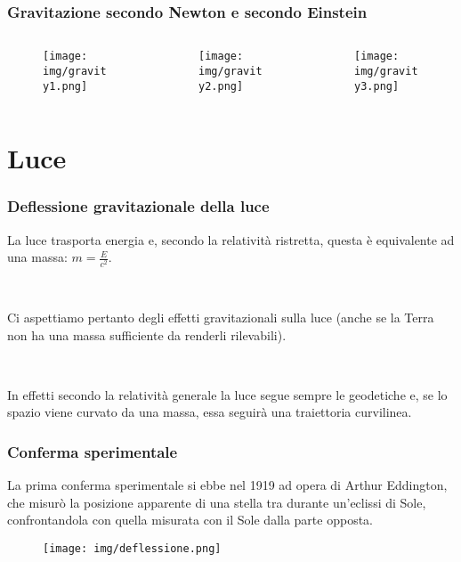 \documentclass[]{beamer}
\theoremstyle{plain}
\begin{document}
\begin{frame}
  \frametitle{Gravitazione secondo Newton e secondo Einstein}
  \begin{columns}
    \begin{column}{0.3\textwidth}
      \begin{figure}
        \texttt{[image: img/gravity1.png]}
      \end{figure}
    \end{column}
    \begin{column}{0.3\textwidth}
      \begin{figure}
        \texttt{[image: img/gravity2.png]}
      \end{figure}
    \end{column}
    \begin{column}{0.3\textwidth}
      \begin{figure}
        \texttt{[image: img/gravity3.png]}
      \end{figure}
    \end{column}

  \end{columns}
\end{frame}

\section{Luce}

\begin{frame}
\frametitle{Deflessione gravitazionale della luce}
La luce trasporta energia e, secondo la relatività ristretta, questa è equivalente ad una massa: $ m = \frac{E}{c^2} $.\pause

~

Ci aspettiamo pertanto degli effetti gravitazionali sulla luce (anche se la Terra non ha una massa sufficiente da renderli rilevabili).\pause

~

In effetti secondo la relatività generale la luce segue sempre le geodetiche e, se lo spazio viene curvato da una massa, essa seguirà una traiettoria curvilinea.
\end{frame}

\begin{frame}
\frametitle{Conferma sperimentale}
La prima conferma sperimentale si ebbe nel 1919 ad opera di Arthur Eddington, che misurò la posizione apparente di una stella tra durante un'eclissi di Sole, confrontandola con quella misurata con il Sole dalla parte opposta.
\begin{figure}
\texttt{[image: img/deflessione.png]}
\end{figure}

\end{frame}
\end{document}
